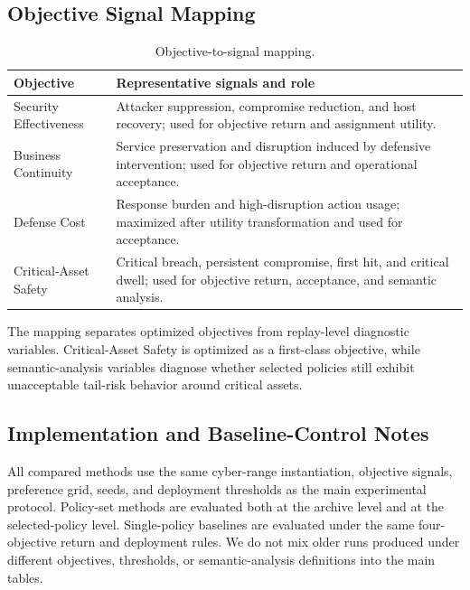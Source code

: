 \documentclass[sigconf,review,anonymous]{acmart}
\begin{document}
\subsection{Objective Signal Mapping}
\label{app:objective-signal-mapping}

\begin{table}[!htbp]
\centering
\caption{Objective-to-signal mapping.}
\label{tab:app-objective-signal-map}
\begingroup
\footnotesize
\setlength{\tabcolsep}{3pt}
\renewcommand{\arraystretch}{1.12}
\begin{tabular*}{\columnwidth}{@{\extracolsep{\fill}}p{}p{}@{}}
\toprule
Objective & Representative signals and role \\
\midrule
Security Effectiveness & Attacker suppression, compromise reduction, and host recovery; used for objective return and assignment utility. \\
Business Continuity & Service preservation and disruption induced by defensive intervention; used for objective return and operational acceptance. \\
Defense Cost & Response burden and high-disruption action usage; maximized after utility transformation and used for acceptance. \\
Critical-Asset Safety & Critical breach, persistent compromise, first hit, and critical dwell; used for objective return, acceptance, and semantic analysis. \\
\bottomrule
\end{tabular*}
\endgroup
\end{table}

The mapping separates optimized objectives from replay-level diagnostic
variables. Critical-Asset Safety is optimized as a first-class objective,
while semantic-analysis variables diagnose whether selected policies
still exhibit unacceptable tail-risk behavior around critical assets.

\subsection{Implementation and Baseline-Control Notes}
\label{app:implementation-notes}

All compared methods use the same cyber-range instantiation, objective
signals, preference grid, seeds, and deployment thresholds as the main
experimental protocol. Policy-set methods are evaluated both at the
archive level and at the selected-policy level. Single-policy baselines
are evaluated under the same four-objective return and deployment rules.
We do not mix older runs produced under different objectives, thresholds,
or semantic-analysis definitions into the main tables.
\end{document}
